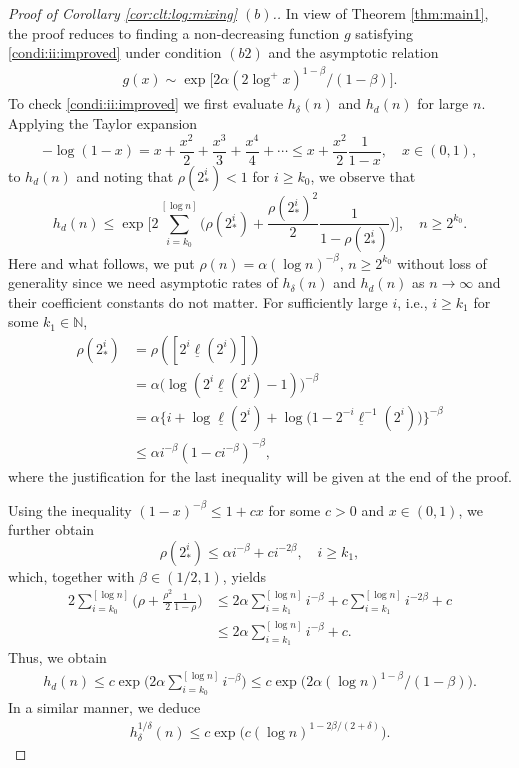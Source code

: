 \documentclass[11pt,a4,leqno]{amsart}
\newcommand{\N}{\mathbb{N}}
\newcommand{\ud}{\underline}
\newcommand{\1}{{\mathbf 1}}
\begin{document}
\begin{proof}[Proof of Corollary \ref{cor:clt:log:mixing} $(b)$.]
In view of Theorem \ref{thm:main1}, the proof reduces to finding a non-decreasing function $g$ satisfying 
\eqref{condi:ii:improved} under condition $(b2)$ and the asymptotic relation 
\begin{align}
\label{asymp:g(n):col2}
    g(x) \sim \exp \big[ 2\alpha (2\log^+ x)^{1-\beta}/(1-\beta) \big].
\end{align}
To check \eqref{condi:ii:improved} 
we first evaluate $h_\delta(n)$ and $h_d(n)$ for large $n$. 
Applying the Taylor expansion 
\[
    -\log (1-x) = x + \frac{x^2}{2} + \frac{x^3}{3} + \frac{x^4}{4} + \cdots \le x + \frac{x^2}{2}\frac{1}{1-x}, \quad x \in (0,1),
\]
to $h_d(n)$ and noting that $\rho(2^i_\ast) < 1$ for $i \ge k_0$, we observe that 
\[
    h_d(n) \le \exp \bigg[ 2 \sum_{i=k_0}^{[\log n]} \Big(\rho(2^i_\ast) + \frac{\rho(2^i_\ast)^2}{2}\frac{1}{1-\rho(2^i_\ast)} \Big) \bigg], \quad n \ge 2^{k_0}.
\]
Here and what follows, we put $\rho(n)=\alpha (\log n)^{-\beta},\,n\ge 2^{k_0}$ without loss of generality 
since we need asymptotic rates of $h_\delta (n)$ and $h_d(n)$ as $n\to\infty$ and their coefficient constants do not matter. 
For sufficiently large $i$, i.e., $i \ge k_1$ for some $k_1 \in \N$, 
\begin{align}
    \rho(2^i_\ast) &= \rho([2^i \ud \ell (2^i)]) \nonumber \\
    &= \alpha \big(\log (2^i \ud \ell(2^i)-1)\big)^{-\beta} \nonumber \\
    &= \alpha \big\{ i + \log \ud \ell(2^i) + \log \big(1-2^{-i}\ud \ell^{-1}(2^i) \big) \big\}^{-\beta} \nonumber \\
    &\le \alpha i^{-\beta} (1-ci^{-\beta})^{-\beta}, \label{evluation:logell}
\end{align}
where the justification for the last inequality will be given at the end of the proof. 


Using the inequality $(1-x)^{-\beta} \le 1+c x$ for some $c>0$ and $x \in (0,1)$, we further obtain 
\[
    \rho(2^i_\ast) \le \alpha i^{-\beta} + ci^{-2\beta}, \quad i \ge k_1,
\]
which, together with $\beta \in (1/2,1)$, yields 
\begin{align*}
    2 \sum_{i=k_0}^{[\log n]} \Big(\rho + \frac{\rho^2}{2}\frac{1}{1-\rho}\Big) 
    &\le 2 \alpha \sum_{i=k_1}^{[\log n]} i^{-\beta} + c \sum_{i=k_1}^{[\log n]} i^{-2\beta} + c \\
    &\le 2\alpha \sum_{i=k_1}^{[\log n]} i^{-\beta} + c.
\end{align*}
Thus, we obtain 
\begin{align}
\label{ineq:evalu:hdn}
    h_d(n) \le c \exp\Big( 2\alpha \sum_{i=k_0}^{[\log n]} i^{-\beta}\Big) \le c \exp \big( 2\alpha (\log n)^{1-\beta}/(1-\beta)\big). 
\end{align}
In a similar manner, we deduce 
\begin{align}
\label{ineq:evalu:hdelta}
    h_\delta^{1/\delta}(n) \le c \exp\Big( c (\log n)^{1-2\beta/(2+\delta)} \Big).
\end{align} 


\end{proof}
\end{document}
